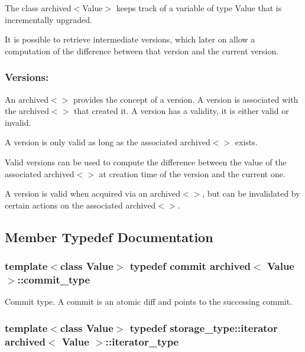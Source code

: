 The class archived$<$\+Value$>$ keeps track of a variable of type Value that is incrementally upgraded.

It is possible to retrieve intermediate versions, which later on allow a computation of the difference between that version and the current version.

\subsubsection*{Versions\+:}

An archived$<$$>$ provides the concept of a version. A version is associated with the archived$<$$>$ that created it. A version has a validity, it is either valid or invalid.

A version is only valid as long as the associated archived$<$$>$ exists.

Valid versions can be used to compute the difference between the value of the associated archived$<$$>$ at creation time of the version and the current one.

A version is valid when acquired via an archived$<$$>$, but can be invalidated by certain actions on the associated archived$<$$>$. 

\subsection{Member Typedef Documentation}
\hypertarget{classarchived_a690d4ac871a018e652efb9b0b69aa7ef}{}
\subsubsection[{commit\+\_\+type}]{\setlength{\rightskip}{0pt plus 5cm}template$<$class Value$>$ typedef {\bf commit} {\bf archived}$<$ Value $>$\+::{\bf commit\+\_\+type}\hspace{0.3cm}{\ttfamily [private]}}\label{classarchived_a690d4ac871a018e652efb9b0b69aa7ef}


Commit type. A commit is an atomic diff and points to the successing commit. 

\hypertarget{classarchived_ae1e2e3488734f8f0bcd58f5f91f31d52}{}
\subsubsection[{iterator\+\_\+type}]{\setlength{\rightskip}{0pt plus 5cm}template$<$class Value$>$ typedef storage\+\_\+type\+::iterator {\bf archived}$<$ Value $>$\+::{\bf iterator\+\_\+type}\hspace{0.3cm}{\ttfamily [private]}}\label{classarchived_ae1e2e3488734f8f0bcd58f5f91f31d52}


